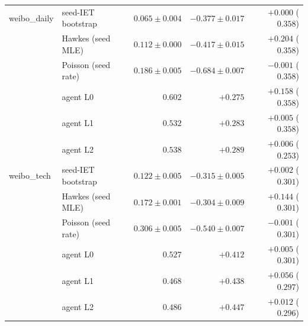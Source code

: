 \begin{table}[h]
\begin{tabular}{llrrr}
\addlinespace[2pt]
weibo\_daily & seed-IET bootstrap & $0.065\pm0.004$ & $-0.377\pm0.017$ & $+0.000$ ($0.358$) \\
 & Hawkes (seed MLE) & $0.112\pm0.000$ & $-0.417\pm0.015$ & $+0.204$ ($0.358$) \\
 & Poisson (seed rate) & $0.186\pm0.005$ & $-0.684\pm0.007$ & $-0.001$ ($0.358$) \\
 & agent L0 & $0.602$ & $+0.275$ & $+0.158$ ($0.358$) \\
 & agent L1 & $0.532$ & $+0.283$ & $+0.005$ ($0.358$) \\
 & agent L2 & $0.538$ & $+0.289$ & $+0.006$ ($0.253$) \\
\addlinespace[2pt]
weibo\_tech & seed-IET bootstrap & $0.122\pm0.005$ & $-0.315\pm0.005$ & $+0.002$ ($0.301$) \\
 & Hawkes (seed MLE) & $0.172\pm0.001$ & $-0.304\pm0.009$ & $+0.144$ ($0.301$) \\
 & Poisson (seed rate) & $0.306\pm0.005$ & $-0.540\pm0.007$ & $-0.001$ ($0.301$) \\
 & agent L0 & $0.527$ & $+0.412$ & $+0.005$ ($0.301$) \\
 & agent L1 & $0.468$ & $+0.438$ & $+0.056$ ($0.297$) \\
 & agent L2 & $0.486$ & $+0.447$ & $+0.012$ ($0.296$) \\
\bottomrule
\end{tabular}
\end{table}
